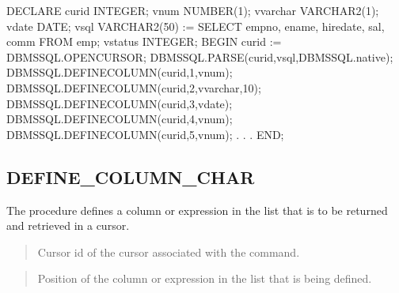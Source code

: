 \documentclass[letterpaper,10pt,english,openany,oneside]{sphinxmanual}
\begin{document}
%
\begin{sphinxVerbatim}[commandchars=\\\{\}]
DECLARE
    curid           INTEGER;
    v\PYGZus{}num           NUMBER(1);
    v\PYGZus{}varchar       VARCHAR2(1);
    v\PYGZus{}date          DATE;
    v\PYGZus{}sql           VARCHAR2(50) := \PYGZsq{}SELECT empno, ename, hiredate, sal, \PYGZsq{} \textbar{}\textbar{}
                                    \PYGZsq{}comm FROM emp\PYGZsq{};
    v\PYGZus{}status        INTEGER;
BEGIN
    curid := DBMS\PYGZus{}SQL.OPEN\PYGZus{}CURSOR;
    DBMS\PYGZus{}SQL.PARSE(curid,v\PYGZus{}sql,DBMS\PYGZus{}SQL.native);
    DBMS\PYGZus{}SQL.DEFINE\PYGZus{}COLUMN(curid,1,v\PYGZus{}num);
    DBMS\PYGZus{}SQL.DEFINE\PYGZus{}COLUMN(curid,2,v\PYGZus{}varchar,10);
    DBMS\PYGZus{}SQL.DEFINE\PYGZus{}COLUMN(curid,3,v\PYGZus{}date);
    DBMS\PYGZus{}SQL.DEFINE\PYGZus{}COLUMN(curid,4,v\PYGZus{}num);
    DBMS\PYGZus{}SQL.DEFINE\PYGZus{}COLUMN(curid,5,v\PYGZus{}num);
            .
            .
            .
END;
\end{sphinxVerbatim}

\newpage


\subsection{DEFINE\_COLUMN\_CHAR}
\label{\detokenize{define_column_char::doc}}\label{\detokenize{define_column_char:define-column-char}}
The  procedure defines a  column or expression
in the  list that is to be returned and retrieved in a cursor.
\begin{quote}

\end{quote}


\begin{quote}

Cursor id of the cursor associated with the  command.
\end{quote}

\begin{quote}

Position of the column or expression in the  list that is being
defined.
\end{quote}
\end{document}
